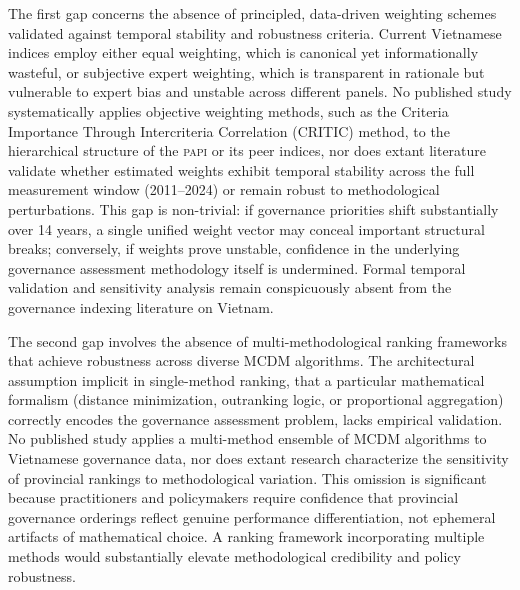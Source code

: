 \documentclass[12pt,a4paper]{article}
\newcommand{\PAPI}{\textsc{papi}\xspace}
\begin{document}
The first gap concerns the absence of principled, data-driven weighting schemes validated against temporal stability and robustness criteria. Current Vietnamese indices employ either equal weighting, which is canonical yet informationally wasteful, or subjective expert weighting, which is transparent in rationale but vulnerable to expert bias and unstable across different panels. No published study systematically applies objective weighting methods, such as the Criteria Importance Through Intercriteria Correlation (CRITIC) method, to the hierarchical structure of the \PAPI or its peer indices, nor does extant literature validate whether estimated weights exhibit temporal stability across the full measurement window (2011--2024) or remain robust to methodological perturbations. This gap is non-trivial: if governance priorities shift substantially over 14 years, a single unified weight vector may conceal important structural breaks; conversely, if weights prove unstable, confidence in the underlying governance assessment methodology itself is undermined. Formal temporal validation and sensitivity analysis remain conspicuously absent from the governance indexing literature on Vietnam.

The second gap involves the absence of multi-methodological ranking frameworks that achieve robustness across diverse MCDM algorithms. The architectural assumption implicit in single-method ranking, that a particular mathematical formalism (distance minimization, outranking logic, or proportional aggregation) correctly encodes the governance assessment problem, lacks empirical validation. No published study applies a multi-method ensemble of MCDM algorithms to Vietnamese governance data, nor does extant research characterize the sensitivity of provincial rankings to methodological variation. This omission is significant because practitioners and policymakers require confidence that provincial governance orderings reflect genuine performance differentiation, not ephemeral artifacts of mathematical choice. A ranking framework incorporating multiple methods would substantially elevate methodological credibility and policy robustness.
\end{document}
